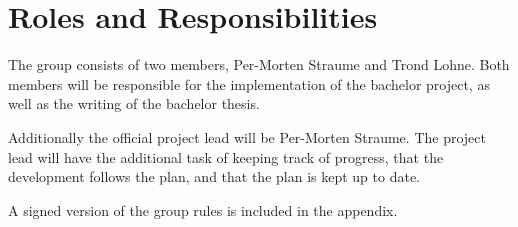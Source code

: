 \section*{Roles and Responsibilities}
The group consists of two members, Per-Morten Straume and Trond Lohne.
Both members will be responsible for the implementation of the bachelor project, as well as the writing of the bachelor thesis.

Additionally the official project lead will be Per-Morten Straume.
The project lead will have the additional task of keeping track of progress,
that the development follows the plan, and that the plan is kept up to date.

A signed version of the group rules is included in the appendix. 
